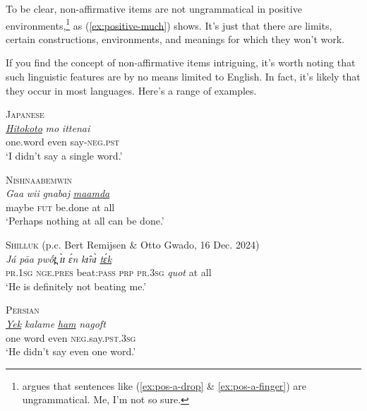To be clear, non-affirmative items are not ungrammatical in  positive environments,\footnote{\citet[3--4]{Israel2011} argues that sentences like  (\ref{ex:pos-a-drop} \& \ref{ex:pos-a-finger}) are ungrammatical. Me, I'm not so sure.} as (\ref{ex:positive-much}) shows. It's just that there are limits, certain constructions, environments, and meanings for which they won't work.

\ea \label{ex:positive-much}
    \z
\z

\begin{tcolorbox}[title=Non-affirmative items in other languages, colback=white]
If you find the concept of non-affirmative items intriguing, it's worth noting that such linguistic features are by no means limited to English. In fact, it's likely that they occur in most languages. Here's a range of examples.

\ea \textsc{Japanese}\\
\gll \textit{\uline{Hitokoto}} \textit{mo} \textit{ittenai}\\
     one.word even say-\textsc{neg.pst} \\
\glt `I didn't say a single word.'
\z

\ea \textsc{Nishnaabemwin} \citep[843]{Valentine2001}\\
\gll \textit{Gaa} \textit{wii} \textit{gnabaj} \textit{\uline{maamda}}\\
     maybe \textsc{fut} be.done {at all}\\
\glt `Perhaps nothing at all can be done.'
\z

\ea \textsc{Shilluk} (p.c. Bert Remijsen \& Otto Gwado, 16 Dec. 2024)\\
\gll \textit{Já} \textit{pāa} \textit{pwốt̪} \textit{ɪ̀ɪ} \textit{ɛ́n} \textit{kɪ̂nɪ̀} \textit{\uline{tɛ́k}}\\
     \textsc{pr.1sg} \textsc{nge.pres} beat:\textsc{pass} \textsc{prp} \textsc{pr.3sg} \textit{quot} {at all}\\
\glt `He is definitely not beating me.'
\z

\ea \textsc{Persian}\\
\gll \textit{\uline{Yek}} \textit{kalame} \textit{\uline{ham}} \textit{nagoft}\\
     one word even \textsc{neg}.say.\textsc{pst.3sg}\\
\glt `He didn't say even one word.'
\z


\end{tcolorbox}
